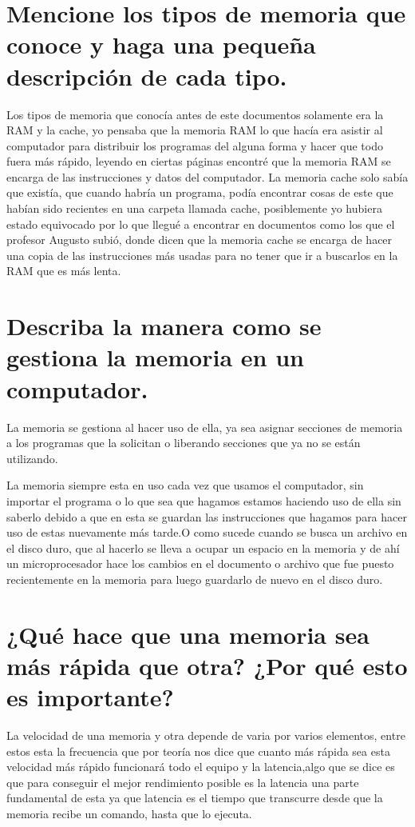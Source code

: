\documentclass{article}
\begin{document}
\section{Mencione los tipos de memoria que conoce y haga una pequeña descripción de cada tipo.} \label{contenido}
Los tipos de memoria que conocía antes de este documentos solamente era la RAM y la cache, yo pensaba que la memoria RAM lo que hacía era asistir al computador para 
distribuir los programas del alguna forma y hacer que todo fuera más rápido, leyendo en ciertas páginas encontré que la memoria RAM se encarga de las instrucciones y
datos del computador.\cite{Ram}
La memoria cache solo sabía que existía, que cuando habría un programa, podía encontrar cosas de este que habían sido recientes en una carpeta llamada cache,
posiblemente yo hubiera estado equivocado por lo que llegué a encontrar en documentos como los que el profesor Augusto subió, donde dicen que la memoria
cache se encarga de hacer una copia de las instrucciones más usadas para no tener que ir a buscarlos en la RAM que es más lenta.\cite{Tame}


\section{Describa la manera como se gestiona la memoria en un computador.}
%
La memoria se gestiona al hacer uso de ella, ya sea asignar secciones de memoria a los programas que la solicitan o liberando secciones que ya no se están utilizando.\citep{Wikime}

La memoria siempre esta en uso cada vez que usamos el computador, sin importar el programa o lo que sea que hagamos estamos haciendo uso de ella sin saberlo debido a que en esta se guardan las instrucciones que hagamos para hacer uso de estas nuevamente más tarde.O como sucede cuando se busca un archivo en el disco duro, que al hacerlo se lleva a ocupar un espacio en la memoria y de ahí un microprocesador hace los cambios en el documento o archivo que fue puesto recientemente en la memoria para luego guardarlo de nuevo en el disco duro.\cite{Tame}



\section{¿Qué hace que una memoria sea más rápida que otra? ¿Por qué esto es importante?} 



La velocidad de una memoria y otra depende de varia por varios elementos, entre estos esta la frecuencia que por teoría nos dice que cuanto más rápida sea esta velocidad más rápido funcionará todo el equipo y la latencia,algo que se dice es que para  conseguir el mejor rendimiento posible es la latencia una parte fundamental de esta ya que latencia es el tiempo que transcurre desde que la memoria recibe un comando, hasta que lo ejecuta.
\end{document}
